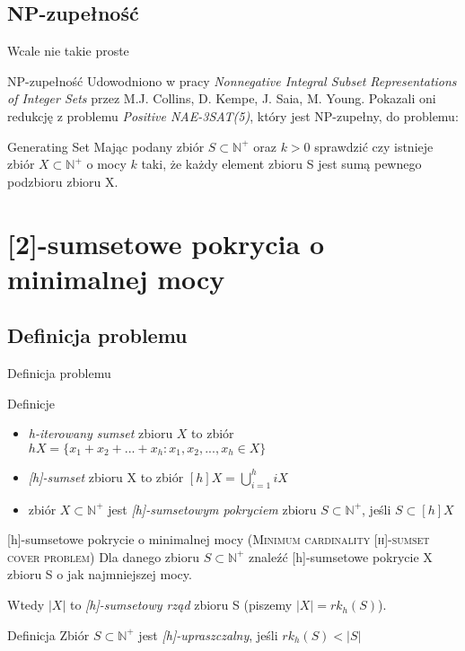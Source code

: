 \documentclass{beamer}
\newcommand{\N}{\mathbb{N}}
\begin{document}
	\subsection{NP-zupełność}
		\begin{frame}{Wcale nie takie proste}
            \begin{block}{NP-zupełność}
                Udowodniono w pracy \emph{Nonnegative Integral Subset Representations of Integer Sets} przez M.J. Collins, D. Kempe, J. Saia, M. Young.
                Pokazali oni redukcję z problemu \emph{Positive NAE-3SAT(5)}, który jest NP-zupełny, do problemu:
            \end{block}
            \begin{alertblock}{Generating Set}
                Mając podany zbiór $ S \subset \N^{+} $ oraz $ k > 0 $ sprawdzić czy istnieje zbiór $ X \subset \N^{+} $ o mocy $ k $ taki, że każdy element zbioru S jest sumą pewnego podzbioru zbioru X.
            \end{alertblock}
		\end{frame}
		
\section{[2]-sumsetowe pokrycia o minimalnej mocy}
	\subsection{Definicja problemu}
		\begin{frame}{Definicja problemu}
			\begin{block}{Definicje}
				\begin{itemize}
					\item \emph{h-iterowany sumset} zbioru $ X $ to zbiór $ hX = \lbrace x_1 + x_2 + ... + x_h : x_1,x_2,...,x_h \in X \rbrace $
					\item \emph{[h]-sumset} zbioru X to zbiór $ [h]X = \bigcup_{i=1}^{h} iX $
					\item zbiór $ X \subset \N^{+} $ jest \emph{[h]-sumsetowym pokryciem} zbioru $ S \subset \N^{+} $, jeśli $ S \subset [h]X $
				\end{itemize}
			\end{block}
			
			\pause
			\begin{alertblock}{[h]-sumsetowe pokrycie o minimalnej mocy (\rmfamily \textsc{Minimum cardinality [h]-sumset cover problem})}
				Dla danego zbioru $ S \subset \N^{+} $ znaleźć [h]-sumsetowe pokrycie X zbioru S o jak najmniejszej mocy.
				
				Wtedy $ |X| $ to \emph{[h]-sumsetowy rząd} zbioru S (piszemy $ |X| = rk_{h}(S) $).
			\end{alertblock}
			
			\pause
			\begin{block}{Definicja}
				Zbiór $ S \subset \N^{+} $ jest \emph{[h]-upraszczalny}, jeśli $ rk_{h}(S) < |S| $
			\end{block}
		\end{frame}
		
\end{document}
